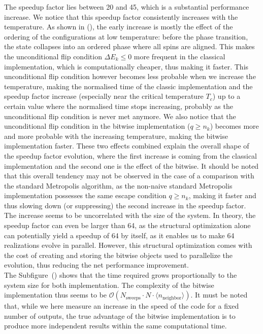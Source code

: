The speedup factor lies between 20 and 45, which is a substantial performance increase. We notice that this speedup factor consistently increases with the temperature. As shown in (), the early increase is mostly the effect of the ordering of the configurations at low temperature: before the phase transition, the state collapses into an ordered phase where all spins are aligned. This makes the unconditional flip condition $\Delta E_k \leq 0$ more frequent in the classical implementation, which is computationally cheaper, thus making it faster. This unconditional flip condition however becomes less probable when we increase the temperature, making the normalised time of the classic implementation and the speedup factor increase (especially near the critical temperature $T_c$) up to a certain value where the normalised time stops increasing, probably as the unconditional flip condition is never met anymore. We also notice that the unconditional flip condition in the bitwise implementation ($q \geq n_k$) becomes more and more probable with the increasing temperature, making the bitwise implementation faster. These two effects combined explain the overall shape of the speedup factor evolution, where the first increase is coming from the classical implementation and the second one is the effect of the bitwise. It should be noted that this overall tendency may not be observed in the case of a comparison with the standard Metropolis algorithm, as the non-naive standard Metropolis implementation possesses the same escape condition $q \geq n_k$, making it faster and thus slowing down (or suppressing) the second increase in the speedup factor. \\
The increase seems to be uncorrelated with the size of the system. In theory, the speedup factor can even be larger than 64, as the structural optimization alone can potentially yield a speedup of 64 by itself, as it enables us to make 64 realizations evolve in parallel. However, this structural optimization comes with the cost of creating and storing the bitwise objects used to parallelize the evolution, thus reducing the net performance improvement.\\
The Subfigure~() shows that the time required grows proportionally to the system size for both implementation. The complexity of the bitwise implementation thus seems to be $\mathcal{O}\left(N_\text{sweeps} \cdot  N \cdot \langle n_\text{neighbor} \rangle \right)$.
It must be noted that, while we here measure an increase in the speed of the code for a fixed number of outputs, the true advantage of the bitwise implementation is to produce more independent results within the same computational time.
